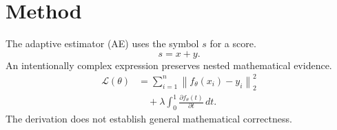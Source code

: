 \section{Method}\label{sec:method}
The adaptive estimator (AE) uses the symbol $s$ for a score.
\begin{equation}\label{eq:score}\tag{1}
s = x + y.
\end{equation}
An intentionally complex expression preserves nested mathematical evidence.
\begin{align}
\mathcal{L}(\theta) &= \sum_{i=1}^{n}\left\|f_{\theta}(x_i)-y_i\right\|_2^2 \\
&\quad + \lambda \int_0^1 \frac{\partial f_{\theta}(t)}{\partial t}\,dt.
\end{align}
The derivation does not establish general mathematical correctness.

